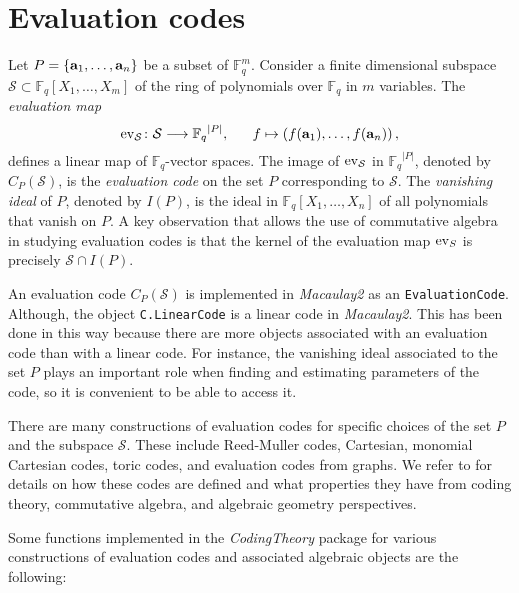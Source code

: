 \documentclass[12pt]{amsart}
\theoremstyle{plain}
\begin{document}
\section{Evaluation codes}\label{eva}
Let $P=\left\{{\bf a}_1,\ldots,{\bf a}_n\right\}$ be a subset of $\mathbb{F}_q^{m}$.
Consider a finite dimensional subspace $\mathcal{S}\subset {\mathbb{F}_q}[X_1,\ldots,X_m]$  of the ring of polynomials over $\mathbb{F}_q$ in $m$ variables. The {\it evaluation map\/}
\begin{equation*}\label{functionevaluation}
{\rm ev}_\mathcal{S}\colon \mathcal{S}\longrightarrow {\mathbb{F}_q}^{|P|},\ \ \ \ \ 
f\mapsto \left(f({\bf a}_1),\ldots,f({\bf a}_n)\right),
\end{equation*}
defines a linear map of ${\mathbb{F}_q}$-vector spaces. The image of ${\rm ev}_\mathcal{S}$ in ${\mathbb{F}_q}^{|P|}$, denoted by $C_{P}(\mathcal{S})$, %
is the {\it evaluation code\/} on the set $P$ corresponding to $\mathcal{S}$. The {\it vanishing ideal} of $P$, denoted by $I(P)$, is the ideal in $\mathbb{F}_q[X_1,\ldots,X_n]$ of all polynomials that vanish on  $P$. A key observation that allows the use of commutative algebra in studying evaluation codes is that the kernel of the evaluation map ${\rm ev}_S$ is precisely $\mathcal{S}\cap I(P)$.

An evaluation code $C_{P}(\mathcal{S})$ is implemented in {\it Macaulay2} as an {\tt EvaluationCode}. Although, the object {\tt C.LinearCode} is a linear code in {\it Macaulay2}. This has been done in this way because there are more objects associated with an evaluation code than with a linear code. For instance, the vanishing ideal associated to the set $P$ plays an important role when finding and estimating parameters of the code, so it is convenient to be able to access it.

There are many constructions of evaluation codes for specific choices of the set $P$ and the subspace $\mathcal{S}$. These include
Reed-Muller codes, Cartesian, monomial Cartesian codes, toric codes, and evaluation codes from graphs. We refer to 
\cite{carvalho4, Ha1, LSc, lopez-villa, MPV, algcodes, Ru, SoSo} for details on how these codes are defined and what properties they have from coding theory, commutative algebra, and algebraic geometry perspectives. 



Some functions implemented in the {\it CodingTheory} package for various constructions of evaluation codes and associated algebraic objects are the following:
\end{document}
